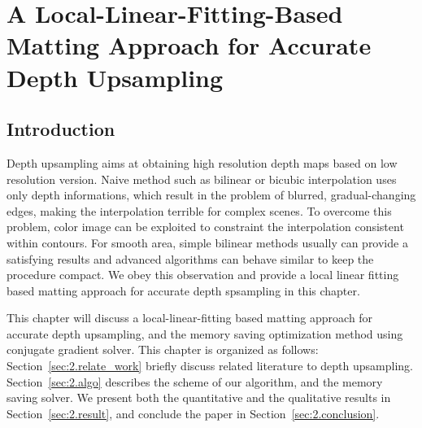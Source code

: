 \chapter{A Local-Linear-Fitting-Based Matting Approach for Accurate Depth Upsampling}
\label{cha2}

\section{Introduction}
\label{sec:2.1.intro}
Depth upsampling aims at obtaining high resolution depth maps based on low resolution version. Naive method such as bilinear or bicubic interpolation uses only depth informations, which result in the problem of blurred, gradual-changing edges, making the interpolation terrible for complex scenes. To overcome this problem, color image can be exploited to constraint the interpolation consistent within contours. For smooth area, simple bilinear methods usually can provide a satisfying results and advanced algorithms can behave similar to keep the procedure compact. We obey this observation and provide a local linear fitting based matting approach for accurate depth spsampling in this chapter.

This chapter will discuss a local-linear-fitting based matting approach for accurate depth upsampling, and the memory saving optimization method using conjugate gradient solver. This chapter is organized as follows: Section~\ref{sec:2.relate_work} briefly discuss related literature to depth upsampling. Section~\ref{sec:2.algo} describes the scheme of our algorithm, and the memory saving solver. We present both the quantitative and the qualitative results in Section~\ref{sec:2.result}, and conclude the paper in Section~\ref{sec:2.conclusion}.

